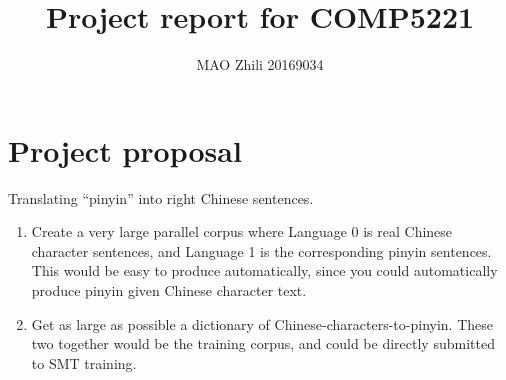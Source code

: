 \documentclass[12pt]{article}
\title{Project report for COMP5221}
\author{MAO Zhili 20169034}
\begin{document}
\maketitle
\section{Project proposal}
Translating ``pinyin'' into right Chinese sentences.
\begin{enumerate} 
\item
Create a very large parallel corpus where Language 0 is real Chinese character sentences, and Language 1 is the corresponding pinyin sentences.  This would be easy to produce automatically, since you could automatically produce pinyin given Chinese character text.
\item
Get as large as possible a dictionary of Chinese-characters-to-pinyin.  
These two together would be the training corpus, and could be directly submitted to SMT training.
\end{enumerate}
\end{document}
